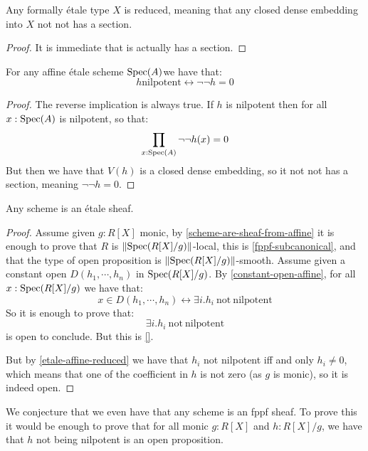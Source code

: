 \begin{lemma}
Any formally étale type $X$ is reduced, meaning that any closed dense embedding into $X$ not not has a section.
\end{lemma}

\begin{proof}
It is immediate that is actually has a section.
\end{proof}

\begin{corollary}\label{etale-affine-reduced}
For any affine étale scheme $\operatorname{Spec}(A)$we have that:
\[h \mathrm{nilpotent} \leftrightarrow \neg\neg h=0\]
\end{corollary}

\begin{proof}
The reverse implication is always true. If $h$ is nilpotent then for all $x:\operatorname{Spec}(A)$ is nilpotent, so that:
\[\prod_{x:\operatorname{Spec}(A)} \neg\neg h(x)=0\]
But then we have that $V(h)$ is a closed dense embedding, so it not not has a section, meaning $\neg\neg h = 0$.
\end{proof}

\begin{proposition}\label{schemes-are-etale-sheaves}
Any scheme is an étale sheaf.
\end{proposition}

\begin{proof}
Assume given $g:R[X]$ monic, by \cref{scheme-are-sheaf-from-affine} it is enough to prove that $R$ is $\lVert \operatorname{Spec}(R[X]/g) \rVert$-local, this is \cref{fppf-subcanonical}, and that the type of open proposition is $\lVert \operatorname{Spec}(R[X]/g) \rVert$-smooth. Assume given a constant open $D(h_1,\cdots,h_n)$ in $\operatorname{Spec}(R[X]/g)$. By \cref{constant-open-affine}, for all $x:\operatorname{Spec}(R[X]/g)$ we have that:
\[x\in D(h_1,\cdots,h_n) \leftrightarrow \exists i. h_i\ \mathrm{not\ nilpotent}\] 
So it is enough to prove that:
\[\exists i. h_i\ \mathrm{not\ nilpotent}\] 
is open to conclude. But this is \cref{}.

But by \cref{etale-affine-reduced} we have that $h_i$ not nilpotent iff and only $h_i\not=0$, which means that one of the coefficient in $h$ is not zero (as $g$ is monic), so it is indeed open.
\end{proof}

\begin{remark}
We conjecture that we even have that any scheme is an fppf sheaf. To prove this it would be enough to prove that for all monic $g:R[X]$ and $h:R[X]/g$, we have that $h$ not being nilpotent is an open proposition.
\end{remark}

